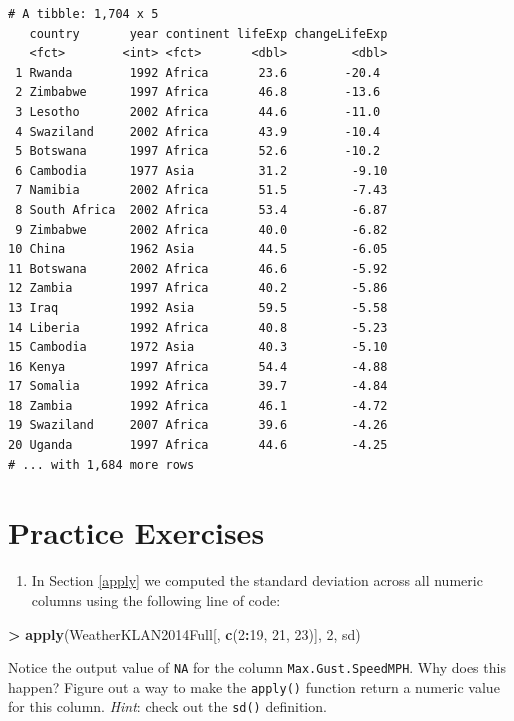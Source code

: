 \documentclass[]{krantz}
\makeatletter
\newenvironment{Shaded}{\begin{snugshade}}{\end{snugshade}}
\newcommand{\DecValTok}[1]{\textcolor[rgb]{0.06,0.06,0.06}{#1}}
\newcommand{\KeywordTok}[1]{\textcolor[rgb]{0.27,0.27,0.27}{\textbf{#1}}}
\newcommand{\NormalTok}[1]{#1}
\newcommand{\OperatorTok}[1]{\textcolor[rgb]{0.43,0.43,0.43}{\textbf{#1}}}
\newcommand{\StringTok}[1]{\textcolor[rgb]{0.5,0.5,0.5}{#1}}
\providecommand{\tightlist}{%
  \setlength{\itemsep}{0pt}\setlength{\parskip}{0pt}}
\newenvironment{kframe}{%
\medskip{}
\setlength{\fboxsep}{.8em}
 \def\at@end@of@kframe{}%
 \ifinner\ifhmode%
  \def\at@end@of@kframe{\end{minipage}}%
  \begin{minipage}{\columnwidth}%
 \fi\fi%
 \def\FrameCommand##1{\hskip\@totalleftmargin \hskip-\fboxsep
 \colorbox{shadecolor}{##1}\hskip-\fboxsep
     \hskip-\linewidth \hskip-\@totalleftmargin \hskip\columnwidth}%
 \MakeFramed {\advance\hsize-\width
   \@totalleftmargin\z@ \linewidth\hsize
   \@setminipage}}%
 {\par\unskip\endMakeFramed%
 \at@end@of@kframe}
\renewenvironment{Shaded}{\begin{kframe}}{\end{kframe}}
\makeatother
\begin{document}
\begin{verbatim}
# A tibble: 1,704 x 5
   country       year continent lifeExp changeLifeExp
   <fct>        <int> <fct>       <dbl>         <dbl>
 1 Rwanda        1992 Africa       23.6        -20.4 
 2 Zimbabwe      1997 Africa       46.8        -13.6 
 3 Lesotho       2002 Africa       44.6        -11.0 
 4 Swaziland     2002 Africa       43.9        -10.4 
 5 Botswana      1997 Africa       52.6        -10.2 
 6 Cambodia      1977 Asia         31.2         -9.10
 7 Namibia       2002 Africa       51.5         -7.43
 8 South Africa  2002 Africa       53.4         -6.87
 9 Zimbabwe      2002 Africa       40.0         -6.82
10 China         1962 Asia         44.5         -6.05
11 Botswana      2002 Africa       46.6         -5.92
12 Zambia        1997 Africa       40.2         -5.86
13 Iraq          1992 Asia         59.5         -5.58
14 Liberia       1992 Africa       40.8         -5.23
15 Cambodia      1972 Asia         40.3         -5.10
16 Kenya         1997 Africa       54.4         -4.88
17 Somalia       1992 Africa       39.7         -4.84
18 Zambia        1992 Africa       46.1         -4.72
19 Swaziland     2007 Africa       39.6         -4.26
20 Uganda        1997 Africa       44.6         -4.25
# ... with 1,684 more rows
\end{verbatim}

\hypertarget{practice-exercises-1}{%
\section{Practice Exercises}\label{practice-exercises-1}}

\begin{enumerate}
\def\labelenumi{\arabic{enumi}.}
\tightlist
\item
  In Section \ref{apply} we computed the standard deviation across all numeric columns using the following line of code:
\end{enumerate}

\begin{Shaded}
\begin{Highlighting}[]
\OperatorTok{>}\StringTok{ }\KeywordTok{apply}\NormalTok{(WeatherKLAN2014Full[, }\KeywordTok{c}\NormalTok{(}\DecValTok{2}\OperatorTok{:}\DecValTok{19}\NormalTok{, }\DecValTok{21}\NormalTok{, }\DecValTok{23}\NormalTok{)], }\DecValTok{2}\NormalTok{, sd)}
\end{Highlighting}
\end{Shaded}

Notice the output value of \texttt{NA} for the column \texttt{Max.Gust.SpeedMPH}. Why does this happen? Figure out a way to make the \texttt{apply()} function return a numeric value for this column. \emph{Hint}: check out the \texttt{sd()} definition.
\end{document}
